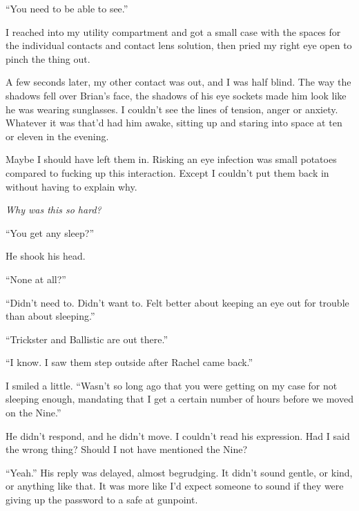 ``You need to be able to see.''



I reached into my utility compartment and got a small case with the spaces for the individual contacts and contact lens solution, then pried my right eye open to pinch the thing out.



A few seconds later, my other contact was out, and I was half blind.  The way the shadows fell over Brian's face, the shadows of his eye sockets made him look like he was wearing sunglasses.  I couldn't see the lines of tension, anger or anxiety.  Whatever it was that'd had him awake, sitting up and staring into space at ten or eleven in the evening.



Maybe I should have left them in.  Risking an eye infection was small potatoes compared to fucking up this interaction.  Except I couldn't put them back in without having to explain why.



\emph{Why was this so hard?}



``You get any sleep?''



He shook his head.



``None at all?''



``Didn't need to.  Didn't want to.  Felt better about keeping an eye out for trouble than about sleeping.''



``Trickster and Ballistic are out there.''



``I know.  I saw them step outside after Rachel came back.''



I smiled a little.  ``Wasn't so long ago that you were getting on my case for not sleeping enough, mandating that I get a certain number of hours before we moved on the Nine.''



He didn't respond, and he didn't move.  I couldn't read his expression.  Had I said the wrong thing?  Should I not have mentioned the Nine?



``Yeah.''  His reply was delayed, almost begrudging.  It didn't sound gentle, or kind, or anything like that.  It was more like I'd expect someone to sound if they were giving up the password to a safe at gunpoint.



